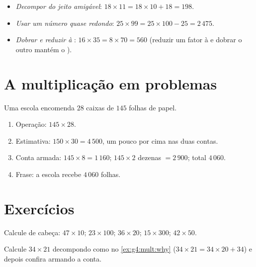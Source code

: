 \begin{example}\label{ex:g4:mult:tricks}
\begin{itemize}
  \item \emph{Decompor do jeito amigável}: $18 \times 11 = 18 \times
        10 + 18 = 198$.
  \item \emph{Usar um número quase redondo}: $25 \times 99 = 25
        \times 100 - 25 = 2\,475$.
  \item \emph{Dobrar e reduzir à }: $16 \times 35 = 8 \times 70
        = 560$ (reduzir um fator à  e dobrar o outro mantém o
        ).
\end{itemize}
\end{example}

\section{A multiplicação em problemas}

\begin{example}\label{ex:g4:mult:problem}
Uma escola encomenda $28$ caixas de $145$ folhas de papel.
\begin{enumerate}
  \item Operação: $145 \times 28$.
  \item Estimativa: $150 \times 30 = 4\,500$, um pouco por cima nas
        duas contas.
  \item Conta armada: $145 \times 8 = 1\,160$; $145 \times 2$
        dezenas $= 2\,900$; total $4\,060$.
  \item Frase: a escola recebe $4\,060$ folhas.
\end{enumerate}
\end{example}

\section{Exercícios}

\begin{exercise}[$\star$]\label{exo:g4:mult:1}
Calcule de cabeça: $47 \times 10$; \quad $23 \times 100$; \quad
$36 \times 20$; \quad $15 \times 300$; \quad $42 \times 50$.
\end{exercise}

\begin{exercise}[$\star$]\label{exo:g4:mult:2}
Calcule $34 \times 21$ decompondo como no \cref{ex:g4:mult:why}
($34 \times 21 = 34 \times 20 + 34$) e depois confira armando a
conta.
\end{exercise}

